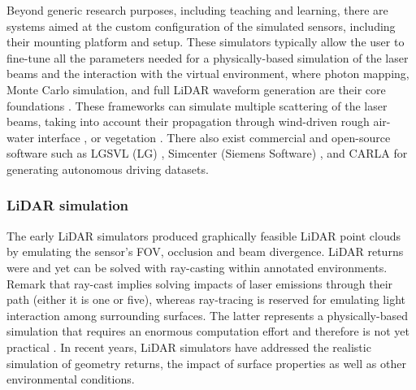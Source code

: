 Beyond generic research purposes, including teaching and learning, there are systems aimed at the custom configuration of the simulated sensors, including their mounting platform and setup. These simulators typically allow the user to fine-tune all the parameters needed for a physically-based simulation of the laser beams and the interaction with the virtual environment, where photon mapping, Monte Carlo simulation, and full LiDAR waveform generation are their core foundations \cite{yun_simulation_2019, chen_ole_2020, zohdi_rapid_2020}. These frameworks can simulate multiple scattering of the laser beams, taking into account their propagation through wind-driven rough air-water interface \cite{chen_ole_2020}, or vegetation \cite{yun_simulation_2019, westling_simtreels_2020}. There also exist commercial and open-source software such as LGSVL (LG) \cite{lg_electronics_rd_lab_lgsvl_2021}, Simcenter (Siemens Software) \cite{siemens_simcenter_2021}, and CARLA \cite{dosovitskiy_carla_2017} for generating autonomous driving datasets.

\subsubsection{LiDAR simulation}

The early LiDAR simulators produced graphically feasible LiDAR point clouds \cite{gschwandtner_blensor_2011} by emulating the sensor's FOV, occlusion and beam divergence. LiDAR returns were and yet can be solved with ray-casting \cite{ahn_real-time_2020, zhao_method_2021, bechtold_helios_2016} within annotated environments. Remark that ray-cast implies solving impacts of laser emissions through their path (either it is one or five), whereas ray-tracing is reserved for emulating light interaction among surrounding surfaces. The latter represents a physically-based simulation that requires an enormous computation effort and therefore is not yet practical \cite{ahn_real-time_2020}. In recent years, LiDAR simulators have addressed the realistic simulation of geometry returns, the impact of surface properties as well as other environmental conditions. 

